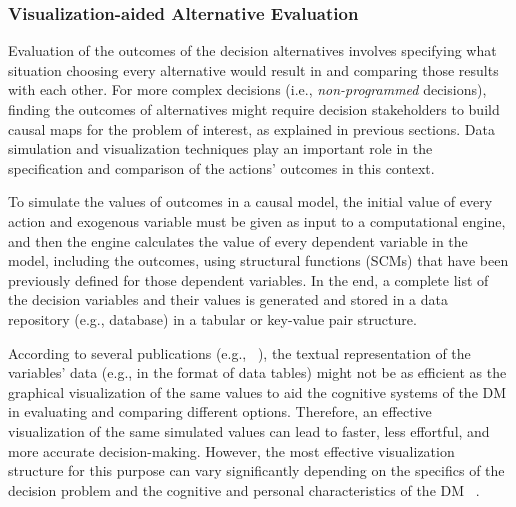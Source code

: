 \documentclass{sfuthesis}
\begin{document}
\subsubsection{Visualization-aided Alternative Evaluation}
Evaluation of the outcomes of the decision alternatives involves specifying what situation choosing every alternative would result in and comparing those results with each other. For more complex decisions (i.e., \textit{non-programmed} decisions), finding the outcomes of alternatives might require decision stakeholders to build causal maps for the problem of interest, as explained in previous sections. Data simulation and visualization techniques play an important role in the specification and comparison of the actions’ outcomes in this context.\par
To simulate the values of outcomes in a causal model, the initial value of every action and exogenous variable must be given as input to a computational engine, and then the engine calculates the value of every dependent variable in the model, including the outcomes, using structural functions (SCMs) that have been previously defined for those dependent variables. In the end, a complete list of the decision variables and their values is generated and stored in a data repository (e.g., database) in a tabular or key-value pair structure.\par
According to several publications (e.g., ~\cite{padilla_decision_2018,eberhard_effects_2023}), the textual representation of the variables’ data (e.g., in the format of data tables) might not be as efficient as the graphical visualization of the same values to aid the cognitive systems of the DM in evaluating and comparing different options. Therefore, an effective visualization of the same simulated values can lead to faster, less effortful, and more accurate decision-making. However, the most effective visualization structure for this purpose can vary significantly depending on the specifics of the decision problem and the cognitive and personal characteristics of the DM ~\cite{gettinger_comparison_2013}.\par
\end{document}
